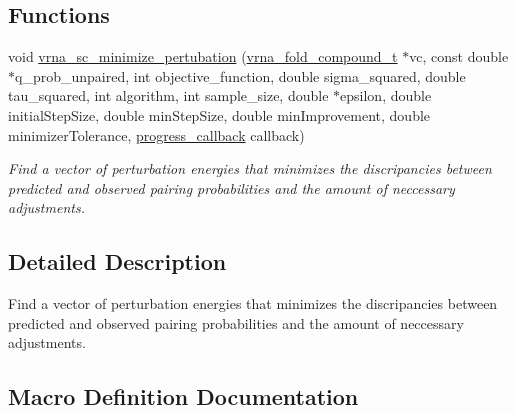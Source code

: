 \subsection*{Functions}
\begin{DoxyCompactItemize}
\item 
void \hyperlink{group__perturbation_gaa124bdc20d88001c38ade590c4bcc3c4}{vrna\+\_\+sc\+\_\+minimize\+\_\+pertubation} (\hyperlink{group__fold__compound_ga1b0cef17fd40466cef5968eaeeff6166}{vrna\+\_\+fold\+\_\+compound\+\_\+t} $\ast$vc, const double $\ast$q\+\_\+prob\+\_\+unpaired, int objective\+\_\+function, double sigma\+\_\+squared, double tau\+\_\+squared, int algorithm, int sample\+\_\+size, double $\ast$epsilon, double initial\+Step\+Size, double min\+Step\+Size, double min\+Improvement, double minimizer\+Tolerance, \hyperlink{group__perturbation_gaa715397c7afd2d2955c315512a3d571a}{progress\+\_\+callback} callback)
\begin{DoxyCompactList}\small\item\em Find a vector of perturbation energies that minimizes the discripancies between predicted and observed pairing probabilities and the amount of neccessary adjustments. \end{DoxyCompactList}\end{DoxyCompactItemize}


\subsection{Detailed Description}
Find a vector of perturbation energies that minimizes the discripancies between predicted and observed pairing probabilities and the amount of neccessary adjustments. 



\subsection{Macro Definition Documentation}
\mbox{\label{group__perturbation_ga81e10993d1ae728e4e02022b33155a12}} 
